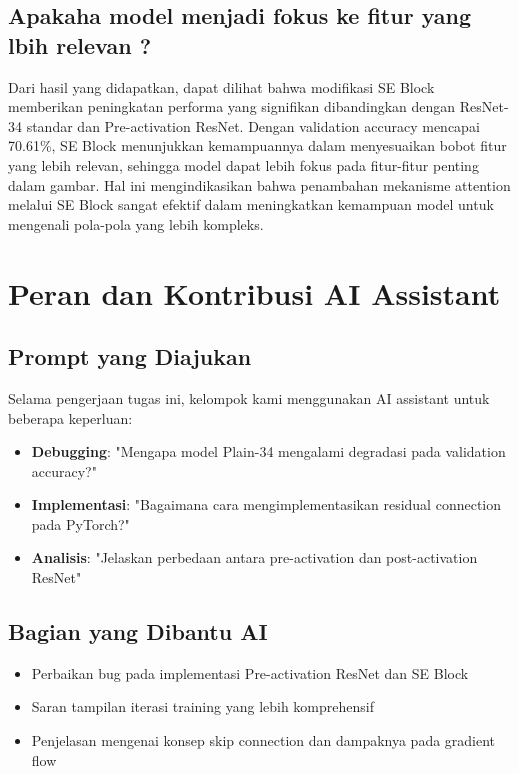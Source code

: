 \documentclass[11pt,a4paper]{article}
\begin{document}
\subsection{Apakaha model menjadi fokus ke fitur yang lbih relevan ?}
Dari hasil yang didapatkan, dapat dilihat bahwa modifikasi SE Block memberikan peningkatan performa yang signifikan dibandingkan dengan ResNet-34 standar dan Pre-activation ResNet. Dengan validation accuracy mencapai 70.61\%, SE Block menunjukkan kemampuannya dalam menyesuaikan bobot fitur yang lebih relevan, sehingga model dapat lebih fokus pada fitur-fitur penting dalam gambar. Hal ini mengindikasikan bahwa penambahan mekanisme attention melalui SE Block sangat efektif dalam meningkatkan kemampuan model untuk mengenali pola-pola yang lebih kompleks.

\section{Peran dan Kontribusi AI Assistant}

\subsection{Prompt yang Diajukan}

Selama pengerjaan tugas ini, kelompok kami menggunakan AI assistant untuk beberapa keperluan:

\begin{itemize}
    \item \textbf{Debugging}: "Mengapa model Plain-34 mengalami degradasi pada validation accuracy?"
    \item \textbf{Implementasi}: "Bagaimana cara mengimplementasikan residual connection pada PyTorch?"
    \item \textbf{Analisis}: "Jelaskan perbedaan antara pre-activation dan post-activation ResNet"
\end{itemize}

\subsection{Bagian yang Dibantu AI}

\begin{itemize}
    \item Perbaikan bug pada implementasi Pre-activation ResNet dan SE Block
    \item Saran tampilan iterasi training yang lebih komprehensif
    \item Penjelasan mengenai konsep skip connection dan dampaknya pada gradient flow
\end{itemize}
\end{document}

